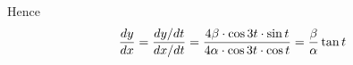 \documentclass[14pt,fleqn]{extarticle}
\begin{document}
\begin{question}
\begin{step}
Hence \[ \frac{dy}{dx} = \frac{dy / dt}{dx / dt} = \frac{4\beta \cdot\cos 3t \cdot \sin t}{4\alpha\cdot\cos 3t\cdot \cos t} = \frac{\beta}{\alpha}\tan t\]
\end{step}
\end{question} 
\end{document}
